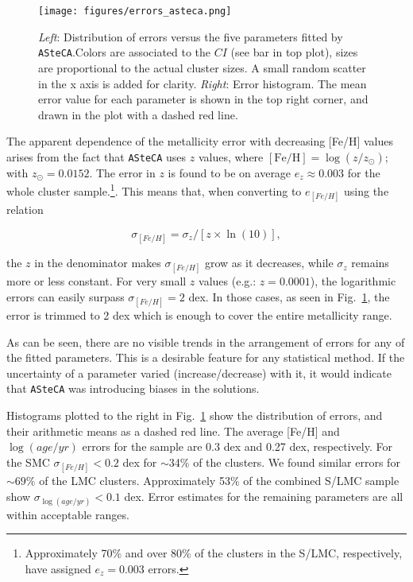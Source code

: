 \documentclass{aa}
\begin{document}
\begin{figure}[!ht]
\centering
\texttt{[image: figures/errors\_asteca.png]}
\caption{\emph{Left}: Distribution of errors versus the five parameters fitted
by \texttt{ASteCA}.\@ Colors are associated to the $CI$ (see bar in top plot),
sizes are proportional to the actual cluster sizes. A small random scatter in
the x axis is added for clarity.
\emph{Right}: Error histogram. The mean error value for each parameter is shown
in the top right corner, and drawn in the plot with a dashed red line.}
\label{fig:errors}
\end{figure}

The apparent dependence of the metallicity error with decreasing [Fe/H] values
arises from the fact that \texttt{ASteCA} uses $z$ values, where
$\mathrm{[Fe/H]}{=}\log(z/z_{\odot})$; with $z_{\odot}{=}0.0152$.
The error in $z$ is found to be on average $e_z{\approx}0.003$ for the whole
cluster sample.\footnote{Approximately 70\% and over 80\% of the clusters in the
S/LMC, respectively, have assigned $e_z{=}0.003$ errors.}. This means that, when
converting to $e_{[Fe/H]}$ using the relation

\begin{equation}
\sigma_{[Fe/H]} = \sigma_z/[z\times\ln(10)],
\end{equation}

\noindent the $z$ in the denominator makes $\sigma_{[Fe/H]}$ grow as it
decreases, while $\sigma_z$ remains more or less constant.
For very small $z$ values (e.g.: $z{=}0.0001$), the
logarithmic errors can easily surpass $\sigma_{[Fe/H]}{=}2$ dex. In those cases,
as seen in Fig.~\ref{fig:errors}, the error is trimmed to 2 dex which is
enough to cover the entire metallicity range.

As can be seen, there are no visible trends in the arrangement of errors for any
of the fitted parameters. This is a desirable feature for any statistical
method. If the uncertainty of a parameter varied (increase/decrease) with it, it
would indicate that \texttt{ASteCA} was introducing biases in the solutions.

Histograms plotted to the right in Fig.~\ref{fig:errors} show the distribution
of errors, and their arithmetic means as a dashed red line.
The average [Fe/H] and $\log(age/yr)$ errors for the sample are 0.3 dex and
0.27 dex, respectively. For the SMC $\sigma_{[Fe/H]}{<}0.2$ dex for $\sim$34\%
of the clusters. We found similar errors for ${\sim}69\%$ of the LMC clusters.
Approximately 53\% of the combined S/LMC sample show
$\sigma_{\log(age/yr)}{<}0.1$ dex. Error estimates for the remaining parameters
are all within acceptable ranges.\\
\end{document}
